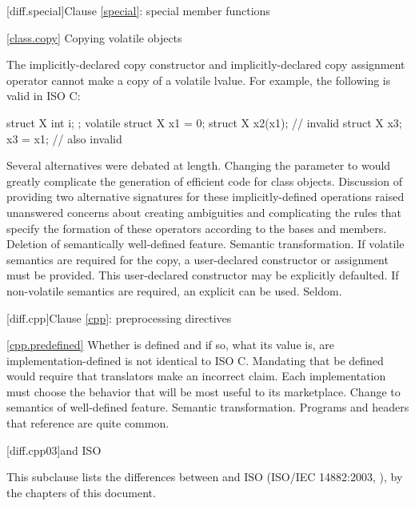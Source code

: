 [diff.special]{Clause \ref{special}: special member functions}

\ref{class.copy}
\change Copying volatile objects

The implicitly-declared copy constructor and
implicitly-declared copy assignment operator
cannot make a copy of a volatile lvalue.
For example, the following is valid in ISO C:

\begin{codeblock}
struct X { int i; };
volatile struct X x1 = {0};
struct X x2(x1);                // invalid \Cpp
struct X x3;
x3 = x1;                        // also invalid \Cpp
\end{codeblock}

\rationale
Several alternatives were debated at length.
Changing the parameter to
would greatly complicate the generation of
efficient code for class objects.
Discussion of
providing two alternative signatures for these
implicitly-defined operations raised
unanswered concerns about creating
ambiguities and complicating
the rules that specify the formation of
these operators according to the bases and
members.
\effect
Deletion of semantically well-defined feature.
\difficulty
Semantic transformation.
If volatile semantics are required for the copy,
a user-declared constructor or assignment must
be provided. \enternote This user-declared
constructor may be explicitly defaulted. \exitnote
If non-volatile semantics are required,
an explicit
can be used.
\howwide
Seldom.

[diff.cpp]{Clause \ref{cpp}: preprocessing directives}

\ref{cpp.predefined}
\change Whether  is defined and if so, what its value is, are
implementation-defined
\rationale
\Cpp is not identical to ISO C\@.
Mandating that 
be defined would require that translators make an incorrect claim.
Each implementation must choose the behavior that will be most
useful to its marketplace.
\effect
Change to semantics of well-defined feature.
\difficulty
Semantic transformation.
\howwide
Programs and headers that reference  are
quite common.

[diff.cpp03]{\Cpp and ISO \CppIII}

\pnum
{}%
This subclause lists the differences between \Cpp and
ISO \CppIII (ISO/IEC 14882:2003, ),
by the chapters of this document.

